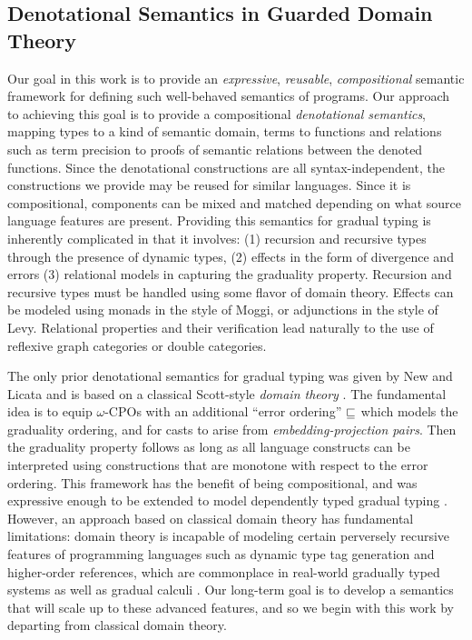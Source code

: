 \subsection{Denotational Semantics in Guarded Domain Theory}

Our goal in this work is to provide an \emph{expressive},
\emph{reusable}, \emph{compositional} semantic framework for defining
such well-behaved semantics of programs.
%
Our approach to achieving this goal is to provide a compositional
\emph{denotational semantics}, mapping types to a kind of semantic
domain, terms to functions and relations such as term precision to
proofs of semantic relations between the denoted functions.
%
Since the denotational constructions are all syntax-independent, the
constructions we provide may be reused for similar languages. Since it
is compositional, components can be mixed and matched depending on
what source language features are present.
%
Providing this semantics for gradual typing is inherently complicated
in that it involves: (1) recursion and recursive types through the
presence of dynamic types, (2) effects in the form of divergence and
errors (3) relational models in capturing the graduality
property. Recursion and recursive types must be handled using some
flavor of domain theory. Effects can be modeled using monads in the
style of Moggi, or adjunctions in the style of Levy. Relational
properties and their verification lead naturally to the use of
reflexive graph categories or double categories.

The only prior denotational semantics for gradual typing was given by
New and Licata and is based on a classical Scott-style \emph{domain
theory} \cite{newlicata2019}. The fundamental idea is to equip
$\omega$-CPOs with an additional ``error ordering'' $\sqsubseteq$ which
models the graduality ordering, and for casts to arise from
\emph{embedding-projection pairs}. Then the graduality property
follows as long as all language constructs can be interpreted using
constructions that are monotone with respect to the error ordering.
%
This framework has the benefit of being compositional, and was
expressive enough to be extended to model dependently typed gradual
typing \cite{dependentgradualtyping}.
%
However, an approach based on classical domain theory has fundamental
limitations: domain theory is incapable of modeling certain perversely
recursive features of programming languages such as dynamic type tag
generation and higher-order references, which are commonplace in
real-world gradually typed systems as well as gradual calculi
\cite{examples-of-gradual-stuff}. Our long-term goal is to develop a
semantics that will scale up to these advanced features, and so we
begin with this work by departing from classical domain theory.

